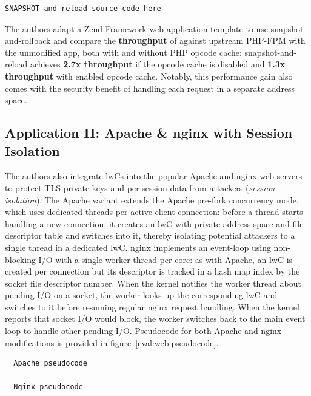 \documentclass[10pt,twocolumn,letter]{article}
\begin{document}
\begin{lstlisting}[label=eval:phpfpm:pseudocode]
  SNAPSHOT-and-reload source code here
\end{lstlisting}

The authors adapt a Zend-Framework web application template to use snapshot-and-rollback and compare the \textbf{throughput} of against upstream PHP-FPM with the unmodified app, both with and without PHP opcode cache:
snapshot-and-reload achieves \textbf{2.7x throughput} if the opcode cache is disabled and \textbf{1.3x throughput} with enabled opcode cache.
Notably, this performance gain also comes with the security benefit of handling each request in a separate address space.

\subsection{Application II: Apache \& nginx with Session Isolation}\label{eval:web}
The authors also integrate lwCs into the popular Apache and nginx web servers to protect TLS private keys and per-session data from attackers (\textit{session isolation}).
The Apache variant extends the Apache pre-fork concurrency mode, which uses dedicated threads per active client connection:
before a thread starts handling a new connection, it creates an lwC with private address space and file descriptor table and switches into it, thereby isolating potential attackers to a single thread in a dedicated lwC.
nginx implements an event-loop using non-blocking I/O with a single worker thread per core:
as with Apache, an lwC is created per connection but its descriptor is tracked in a hash map index by the socket file descriptor number.
When the kernel notifies the worker thread about pending I/O on a socket, the worker looks up the corresponding lwC and switches to it before resuming regular nginx request handling.
When the kernel reports that socket I/O would block, the worker switches back to the main event loop to handle other pending I/O.
Pseudocode for both Apache and nginx modifications is provided in figure~\ref{eval:web:pseudocode}.

\begin{lstlisting}
  Apache pseudocode

  Nginx pseudocode
\end{lstlisting}
\end{document}
